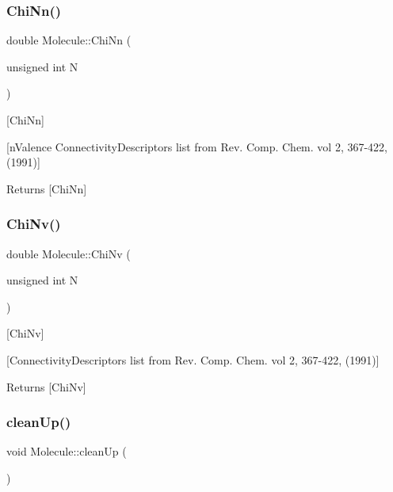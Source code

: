 \subsubsection{\texorpdfstring{Chi\+Nn()}{ChiNn()}}
{\footnotesize\ttfamily double Molecule\+::\+Chi\+Nn (\begin{DoxyParamCaption}\item[{unsigned int}]{N }\end{DoxyParamCaption})}



\mbox{[}Chi\+Nn\mbox{]} 

\mbox{[}n\+Valence Connectivity\+Descriptors list from Rev. Comp. Chem. vol 2, 367-\/422, (1991)\mbox{]}

\begin{DoxyReturn}{Returns}
\mbox{[}Chi\+Nn\mbox{]} 
\end{DoxyReturn}
\mbox{\label{class_molecule_ada6fd7f4b47622e5a07d80052cf0d0b5}} 
\subsubsection{\texorpdfstring{Chi\+Nv()}{ChiNv()}}
{\footnotesize\ttfamily double Molecule\+::\+Chi\+Nv (\begin{DoxyParamCaption}\item[{unsigned int}]{N }\end{DoxyParamCaption})}



\mbox{[}Chi\+Nv\mbox{]} 

\mbox{[}Connectivity\+Descriptors list from Rev. Comp. Chem. vol 2, 367-\/422, (1991)\mbox{]}

\begin{DoxyReturn}{Returns}
\mbox{[}Chi\+Nv\mbox{]} 
\end{DoxyReturn}
\mbox{\label{class_molecule_ae9aeca03c03bbd36ab63c4a69e2ddc82}} 
\subsubsection{\texorpdfstring{clean\+Up()}{cleanUp()}}
{\footnotesize\ttfamily void Molecule\+::clean\+Up (\begin{DoxyParamCaption}{ }\end{DoxyParamCaption})}




